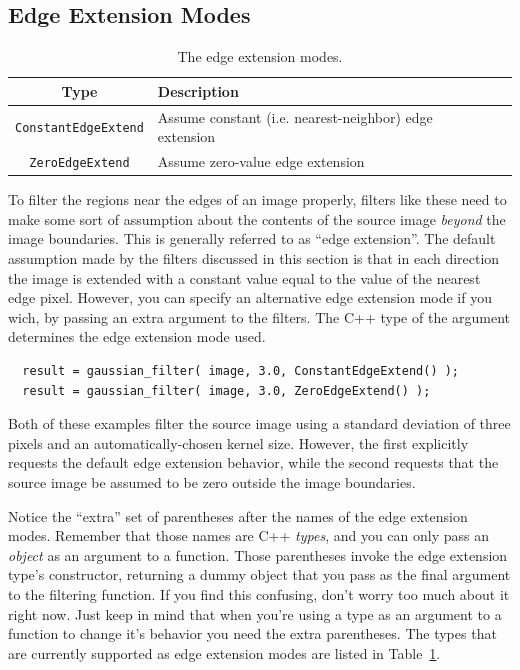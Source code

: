 \subsection{Edge Extension Modes}
\label{sec:filter-edge-extend}

\begin{table}[t]\begin{centering}
\begin{tabular}{|c|l|l|} \hline
Type & Description \\ \hline \hline
\verb#ConstantEdgeExtend# & Assume constant (i.e. nearest-neighbor) edge extension \\ \hline
\verb#ZeroEdgeExtend# & Assume zero-value edge extension \\ \hline
\end{tabular}
\caption{The edge extension modes.}
\label{tbl:edge-extension-modes}
\end{centering}\end{table}

To filter the regions near the edges of an image properly, 
filters like these need to make some sort of assumption 
about the contents of the source image {\it beyond} the 
image boundaries.  This is generally referred to as ``edge 
extension''.  The default assumption made by the filters 
discussed in this section is that in each direction the 
image is extended with a constant value equal to the value 
of the nearest edge pixel.  However, you can specify an 
alternative edge extension mode if you wich, by passing 
an extra argument to the filters.  The C++ type of the 
argument determines the edge extension mode used.  
\begin{verbatim}
  result = gaussian_filter( image, 3.0, ConstantEdgeExtend() );
  result = gaussian_filter( image, 3.0, ZeroEdgeExtend() );
\end{verbatim}
Both of these examples filter the source image using a 
standard deviation of three pixels and an automatically-chosen 
kernel size.  However, the first explicitly requests the 
default edge extension behavior, while the second requests 
that the source image be assumed to be zero outside the 
image boundaries.

Notice the ``extra'' set of parentheses after the names 
of the edge extension modes.  Remember that those names are 
C++ {\it types}, and you can only pass an {\it object} as an 
argument to a function.  Those parentheses invoke the 
edge extension type's constructor, returning a dummy 
object that you pass as the final argument to the filtering 
function.  If you find this confusing, don't worry too much 
about it right now.  Just keep in mind that when you're 
using a type as an argument to a function to change it's 
behavior you need the extra parentheses.  The types that 
are currently supported as edge extension modes are listed 
in Table~\ref{tbl:edge-extension-modes}.

